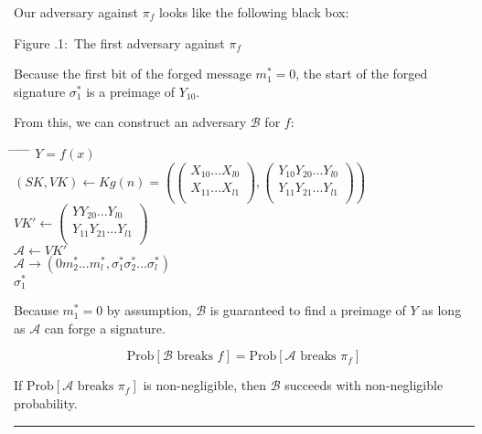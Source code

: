 \documentclass[twoside]{article}
\newcounter{lecnum}
\newcommand{\fig}[3]{
            \vspace{#2}
            \begin{center}
            Figure \thelecnum.#1:~#3
            \end{center}
    }
\newenvironment{proof}{{\bf Proof:}}{\hfill\rule{2mm}{2mm}}
\begin{document}
\begin{proof}
Our adversary against $\pi_f$ looks like the following black box:

\begin{center}
\end{center}
\fig{1}{0in}{The first adversary against $\pi_f$}

Because the first bit of the forged message $m^*_1 = 0$, the start of the forged signature $\sigma^*_1$ is a preimage of $Y_{10}$.

From this, we can construct an adversary $\mathcal{B}$ for $f$:

\begin{tabbing}
\hspace*{.25in} \= \hspace*{.25in} \= \hspace*{.25in} \= \hspace*{.25in} \= \hspace*{.25in} \=\kill
{} $Y = f(x)$\\
\>$(SK, VK) \leftarrow Kg(n) = \left(
\begin{pmatrix}
X_{10}...X_{l0}\\
X_{11}...X_{l1}\\
\end{pmatrix},
\begin{pmatrix}
Y_{10}Y_{20}...Y_{l0}\\
Y_{11}Y_{21}...Y_{l1}\\
\end{pmatrix}\right)$\\
\>$VK' \leftarrow
\begin{pmatrix}
YY_{20}...Y_{l0}\\
Y_{11}Y_{21}...Y_{l1}\\
\end{pmatrix}$\\
\>$\mathcal{A} \leftarrow VK'$\\
\>$\mathcal{A} \rightarrow (0m^*_2...m^*_l,\sigma^*_1\sigma^*_2...\sigma^*_l)$\\
 $\sigma^*_1$
\end{tabbing}

Because $m^*_1 = 0$ by assumption, $\mathcal{B}$ is guaranteed to find a preimage of $Y$ as long as $\mathcal{A}$ can forge a signature.

$$\text{Prob}[\mathcal{B}\text{ breaks }f] = \text{Prob}[\mathcal{A}\text{ breaks }\pi_f]$$

If $\text{Prob}[\mathcal{A}\text{ breaks }\pi_f]$ is non-negligible, then $\mathcal{B}$ succeeds with non-negligible probability.
\end{proof}
\end{document}
